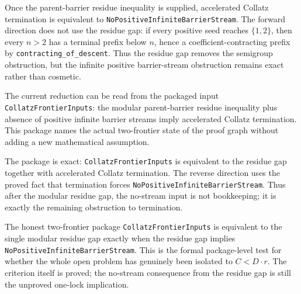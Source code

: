 \begin{theorem}
  \label{thm:collatz-residue-exact-obstruction}
  \leanok
  Once the parent-barrier residue inequality is supplied, accelerated Collatz termination is
  equivalent to \texttt{NoPositiveInfiniteBarrierStream}. The forward direction does not use the
  residue gap: if every positive seed reaches \(\{1,2\}\), then every \(n>2\) has a terminal
  prefix below \(n\), hence a coefficient-contracting prefix by
  \texttt{contracting\_of\_descent}. Thus the residue gap removes the semigroup obstruction, but
  the infinite positive barrier-stream obstruction remains exact rather than cosmetic.
\end{theorem}
\begin{theorem}
  \label{thm:collatz-frontier-inputs}
  \leanok
  The current reduction can be read from the packaged input
  \texttt{CollatzFrontierInputs}: the modular parent-barrier residue inequality plus
  absence of positive infinite barrier streams imply accelerated Collatz termination.
  This package names the actual two-frontier state of the proof graph without adding
  a new mathematical assumption.
\end{theorem}
\begin{theorem}
  \label{thm:collatz-frontier-inputs-exact}
  \leanok
  The package is exact: \texttt{CollatzFrontierInputs} is equivalent to the residue
  gap together with accelerated Collatz termination. The reverse direction uses the
  proved fact that termination forces \texttt{NoPositiveInfiniteBarrierStream}. Thus
  after the modular residue gap, the no-stream input is not bookkeeping; it is exactly
  the remaining obstruction to termination.
\end{theorem}
\begin{theorem}
  \label{thm:collatz-frontier-inputs-one-gap-collapse}
  \leanok
  The honest two-frontier package \texttt{CollatzFrontierInputs} is equivalent to
  the single modular residue gap exactly when the residue gap implies
  \texttt{NoPositiveInfiniteBarrierStream}. This is the formal package-level test
  for whether the whole open problem has genuinely been isolated to
  \(C<D\cdot r\). The criterion itself is proved; the no-stream consequence from the
  residue gap is still the unproved one-lock implication.
\end{theorem}
